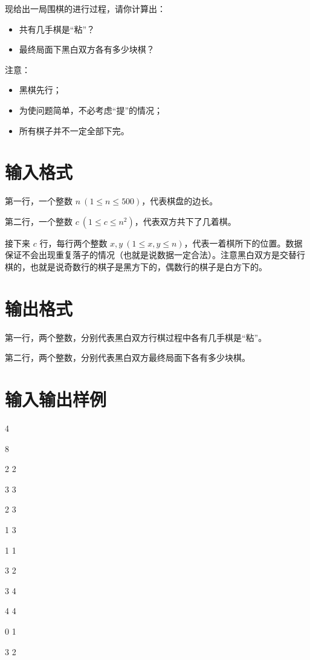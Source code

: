 \documentclass{ctpro}
\begin{document}
现给出一局围棋的进行过程，请你计算出：

\begin{itemize}
	\item 共有几手棋是“粘”？
	\item 最终局面下黑白双方各有多少块棋？
\end{itemize}

注意：

\begin{itemize}
	\item 黑棋先行；
	\item 为使问题简单，不必考虑“提”的情况；
	\item 所有棋子并不一定全部下完。
\end{itemize}

\section*{输入格式}
第一行，一个整数 $n~(1 \leq n \leq 500)$，代表棋盘的边长。

第二行，一个整数 $c~(1 \leq c \leq n^2)$，代表双方共下了几着棋。

接下来 $c$ 行，每行两个整数 $x,y~(1 \leq x,y \leq n)$，代表一着棋所下的位置。数据保证不会出现重复落子的情况（也就是说数据一定合法）。注意黑白双方是交替行棋的，也就是说奇数行的棋子是黑方下的，偶数行的棋子是白方下的。

\section*{输出格式}
第一行，两个整数，分别代表黑白双方行棋过程中各有几手棋是“粘”。

第二行，两个整数，分别代表黑白双方最终局面下各有多少块棋。

\section*{输入输出样例}
\testcasetab
{
	4\par
	8\par
	2 2\par
	3 3\par
	2 3\par
	1 3\par
	1 1\par
	3 2\par
	3 4\par
	4 4
}
{
	0 1\par
	3 2
}
\end{document}
